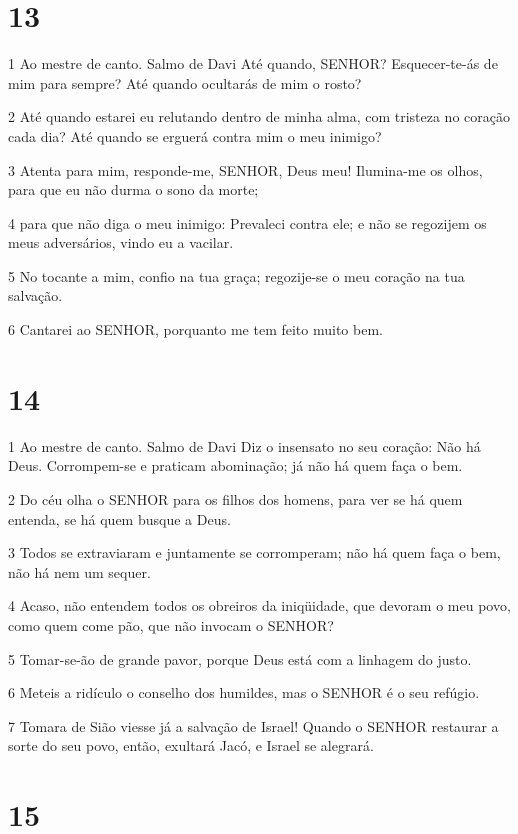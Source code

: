 \chapter{13}

\par 1 Ao mestre de canto. Salmo de Davi Até quando, SENHOR? Esquecer-te-ás de mim para sempre? Até quando ocultarás de mim o rosto?
\par 2 Até quando estarei eu relutando dentro de minha alma, com tristeza no coração cada dia? Até quando se erguerá contra mim o meu inimigo?
\par 3 Atenta para mim, responde-me, SENHOR, Deus meu! Ilumina-me os olhos, para que eu não durma o sono da morte;
\par 4 para que não diga o meu inimigo: Prevaleci contra ele; e não se regozijem os meus adversários, vindo eu a vacilar.
\par 5 No tocante a mim, confio na tua graça; regozije-se o meu coração na tua salvação.
\par 6 Cantarei ao SENHOR, porquanto me tem feito muito bem.

\chapter{14}

\par 1 Ao mestre de canto. Salmo de Davi Diz o insensato no seu coração: Não há Deus. Corrompem-se e praticam abominação; já não há quem faça o bem.
\par 2 Do céu olha o SENHOR para os filhos dos homens, para ver se há quem entenda, se há quem busque a Deus.
\par 3 Todos se extraviaram e juntamente se corromperam; não há quem faça o bem, não há nem um sequer.
\par 4 Acaso, não entendem todos os obreiros da iniqüidade, que devoram o meu povo, como quem come pão, que não invocam o SENHOR?
\par 5 Tomar-se-ão de grande pavor, porque Deus está com a linhagem do justo.
\par 6 Meteis a ridículo o conselho dos humildes, mas o SENHOR é o seu refúgio.
\par 7 Tomara de Sião viesse já a salvação de Israel! Quando o SENHOR restaurar a sorte do seu povo, então, exultará Jacó, e Israel se alegrará.

\chapter{15}

